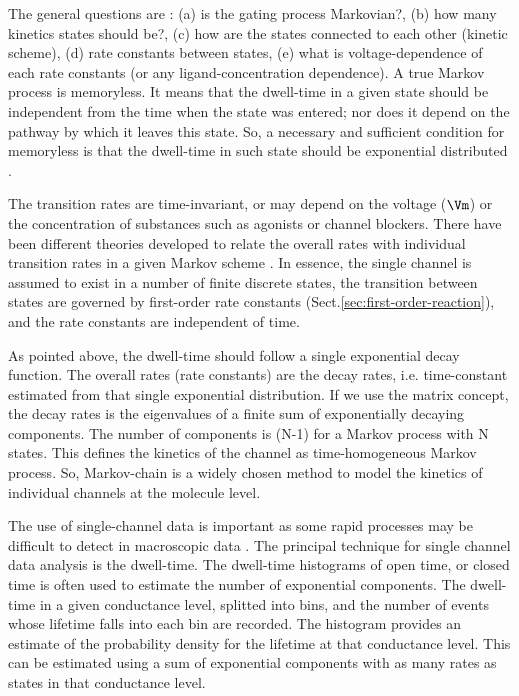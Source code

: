 \begin{framed}
The general questions are \citep{Horn1984}: (a) is the gating process
Markovian?, (b) how many kinetics states should be?, (c) how are the states
connected to each other (kinetic scheme), (d) rate constants between states, (e)
what is voltage-dependence of each rate constants (or any ligand-concentration
dependence). A true Markov process is memoryless. It means that the dwell-time
in a given state should be independent from the time when the state was entered;
nor does it depend on the pathway by which it leaves this state. So, a necessary
and sufficient condition for memoryless is that the dwell-time in such state
should be exponential distributed \citep{feller1971, Horn1984}.
\end{framed}

The transition rates are time-invariant, or may depend on the voltage ($\Vm$) or
the concentration of substances such as agonists or channel blockers. There have
been different theories developed to relate the overall rates with individual
transition rates in a given Markov scheme \citep{Horn1983}.
In essence, the single channel is assumed to exist in a number of finite
discrete states, the transition between states are governed by first-order rate
constants (Sect.\ref{sec:first-order-reaction}), and the rate constants are
independent of time.

As pointed above, the dwell-time should follow a single exponential decay
function. The overall rates (rate constants) are the decay rates, i.e.
time-constant estimated from that single exponential distribution. If we use the
matrix concept, the decay rates is the eigenvalues of a finite sum of
exponentially decaying components. The number of components is (N-1) for a
Markov process with N states. This defines the kinetics of the channel as
time-homogeneous Markov process. So, Markov-chain is a widely chosen method to
model the kinetics of individual channels at the molecule level.

\begin{framed}

The use of single-channel data is important as some rapid processes may be
difficult to detect in macroscopic data \citep{patlak1983}. The principal
technique for single channel data analysis is the dwell-time. The dwell-time
histograms of open time, or closed time is often used to estimate the number of
exponential components. The dwell-time in a given conductance level, splitted
into bins, and the number of events whose lifetime falls into each bin are
recorded. The histogram provides an estimate of the probability density for the
lifetime at that conductance level. This can be estimated using a sum of
exponential components with as many rates as states in that conductance level.
\end{framed}


